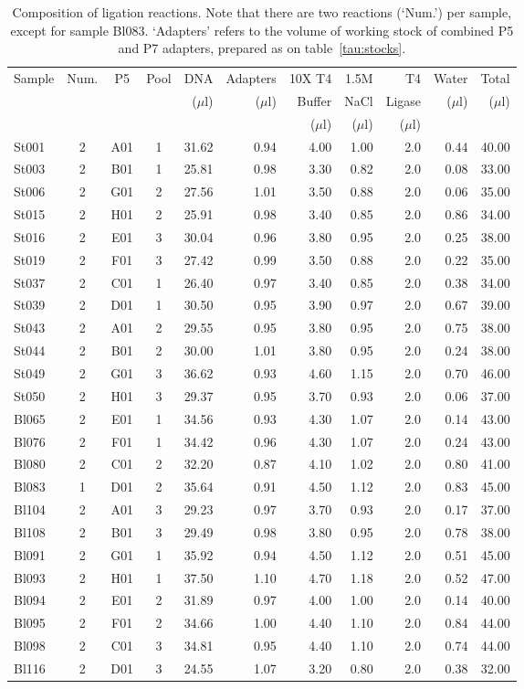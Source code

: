 \documentclass[a4paper,12pt,twosided]{article}
\begin{document}
\begin{table}
\begin{center}
{\footnotesize
\caption{Composition of ligation reactions. Note that there are two reactions (`Num.') per sample, except for sample Bl083. `Adapters' refers to the volume of working stock of combined P5 and P7 adapters, prepared as on table~\ref{tau:stocks}.}\label{tau:ligations2}
\vspace*{0.2cm}
\begin{tabular}{lcccrrrrrrr}
\toprule
Sample&Num.&P5&Pool&DNA&Adapters&10X T4&1.5M&T4&Water&Total\\
&&&&($\mu$l)&($\mu$l)&Buffer&NaCl&Ligase&($\mu$l)&($\mu$l)\\
&&&&&&($\mu$l)&($\mu$l)&($\mu$l)&&\\
\midrule
St001&2&A01&1&31.62&0.94&4.00&1.00&2.0&0.44&40.00\\
St003&2&B01&1&25.81&0.98&3.30&0.82&2.0&0.08&33.00\\
St006&2&G01&2&27.56&1.01&3.50&0.88&2.0&0.06&35.00\\
St015&2&H01&2&25.91&0.98&3.40&0.85&2.0&0.86&34.00\\
St016&2&E01&3&30.04&0.96&3.80&0.95&2.0&0.25&38.00\\
St019&2&F01&3&27.42&0.99&3.50&0.88&2.0&0.22&35.00\\
St037&2&C01&1&26.40&0.97&3.40&0.85&2.0&0.38&34.00\\
St039&2&D01&1&30.50&0.95&3.90&0.97&2.0&0.67&39.00\\
St043&2&A01&2&29.55&0.95&3.80&0.95&2.0&0.75&38.00\\
St044&2&B01&2&30.00&1.01&3.80&0.95&2.0&0.24&38.00\\
St049&2&G01&3&36.62&0.93&4.60&1.15&2.0&0.70&46.00\\
St050&2&H01&3&29.37&0.95&3.70&0.93&2.0&0.06&37.00\\
Bl065&2&E01&1&34.56&0.93&4.30&1.07&2.0&0.14&43.00\\
Bl076&2&F01&1&34.42&0.96&4.30&1.07&2.0&0.24&43.00\\
Bl080&2&C01&2&32.20&0.87&4.10&1.02&2.0&0.80&41.00\\
Bl083&1&D01&2&35.64&0.91&4.50&1.12&2.0&0.83&45.00\\
Bl104&2&A01&3&29.23&0.97&3.70&0.93&2.0&0.17&37.00\\
Bl108&2&B01&3&29.49&0.98&3.80&0.95&2.0&0.78&38.00\\
Bl091&2&G01&1&35.92&0.94&4.50&1.12&2.0&0.51&45.00\\
Bl093&2&H01&1&37.50&1.10&4.70&1.18&2.0&0.52&47.00\\
Bl094&2&E01&2&31.89&0.97&4.00&1.00&2.0&0.14&40.00\\
Bl095&2&F01&2&34.66&1.00&4.40&1.10&2.0&0.84&44.00\\
Bl098&2&C01&3&34.81&0.95&4.40&1.10&2.0&0.74&44.00\\
Bl116&2&D01&3&24.55&1.07&3.20&0.80&2.0&0.38&32.00\\
\bottomrule
\end{tabular}
}
\end{center}
\end{table}
\end{document}
